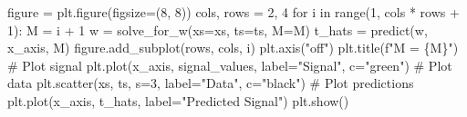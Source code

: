 \documentclass[
  0.875em,
  letterpaper,
  DIV=11,
  numbers=noendperiod]{scrartcl}
\newenvironment{Shaded}{\begin{snugshade}}{\end{snugshade}}
\newcommand{\BuiltInTok}[1]{\textcolor[rgb]{0.00,0.23,0.31}{#1}}
\newcommand{\CommentTok}[1]{\textcolor[rgb]{0.37,0.37,0.37}{#1}}
\newcommand{\ControlFlowTok}[1]{\textcolor[rgb]{0.00,0.23,0.31}{#1}}
\newcommand{\DecValTok}[1]{\textcolor[rgb]{0.68,0.00,0.00}{#1}}
\newcommand{\KeywordTok}[1]{\textcolor[rgb]{0.00,0.23,0.31}{#1}}
\newcommand{\NormalTok}[1]{\textcolor[rgb]{0.00,0.23,0.31}{#1}}
\newcommand{\OperatorTok}[1]{\textcolor[rgb]{0.37,0.37,0.37}{#1}}
\newcommand{\SpecialCharTok}[1]{\textcolor[rgb]{0.37,0.37,0.37}{#1}}
\newcommand{\SpecialStringTok}[1]{\textcolor[rgb]{0.13,0.47,0.30}{#1}}
\newcommand{\StringTok}[1]{\textcolor[rgb]{0.13,0.47,0.30}{#1}}
\begin{document}
\begin{Shaded}
\begin{Highlighting}[]
\NormalTok{figure }\OperatorTok{=}\NormalTok{ plt.figure(figsize}\OperatorTok{=}\NormalTok{(}\DecValTok{8}\NormalTok{, }\DecValTok{8}\NormalTok{))}
\NormalTok{cols, rows }\OperatorTok{=} \DecValTok{2}\NormalTok{, }\DecValTok{4}
\ControlFlowTok{for}\NormalTok{ i }\KeywordTok{in} \BuiltInTok{range}\NormalTok{(}\DecValTok{1}\NormalTok{, cols }\OperatorTok{*}\NormalTok{ rows }\OperatorTok{+} \DecValTok{1}\NormalTok{):}
\NormalTok{    M }\OperatorTok{=}\NormalTok{ i }\OperatorTok{+} \DecValTok{1}
\NormalTok{    w }\OperatorTok{=}\NormalTok{ solve\_for\_w(xs}\OperatorTok{=}\NormalTok{xs, ts}\OperatorTok{=}\NormalTok{ts, M}\OperatorTok{=}\NormalTok{M)}
\NormalTok{    t\_hats }\OperatorTok{=}\NormalTok{ predict(w, x\_axis, M)}
\NormalTok{    figure.add\_subplot(rows, cols, i)}
\NormalTok{    plt.axis(}\StringTok{"off"}\NormalTok{)}
\NormalTok{    plt.title(}\SpecialStringTok{f"M = }\SpecialCharTok{\{}\NormalTok{M}\SpecialCharTok{\}}\SpecialStringTok{"}\NormalTok{)}
    \CommentTok{\# Plot signal}
\NormalTok{    plt.plot(x\_axis, signal\_values, label}\OperatorTok{=}\StringTok{"Signal"}\NormalTok{, c}\OperatorTok{=}\StringTok{"green"}\NormalTok{)}
    \CommentTok{\# Plot data}
\NormalTok{    plt.scatter(xs, ts, s}\OperatorTok{=}\DecValTok{3}\NormalTok{, label}\OperatorTok{=}\StringTok{"Data"}\NormalTok{, c}\OperatorTok{=}\StringTok{"black"}\NormalTok{)}
    \CommentTok{\# Plot predictions}
\NormalTok{    plt.plot(x\_axis, t\_hats, label}\OperatorTok{=}\StringTok{"Predicted Signal"}\NormalTok{)}
\NormalTok{plt.show()}
\end{Highlighting}
\end{Shaded}
\end{document}
